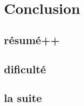 \documentclass[../report]{subfiles}
\begin{document}
\chapter{Conclusion}
\todo{}

\section{résumé++}
\section{dificulté}
\section{la suite}
\end{document}
